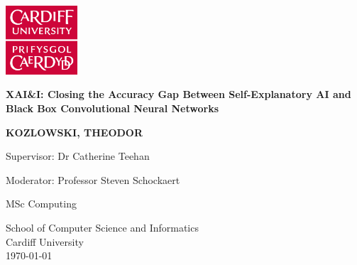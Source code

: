 \begin{titlepage}
    \begin{center}
         \centering
         \includegraphics[width=0.2\textwidth]{images/CUident_RGB.jpg}
         
        \Huge
        \textbf{XAI\&I: Closing the Accuracy Gap Between Self-Explanatory AI and Black Box Convolutional Neural Networks}
        
        
        \vspace{1.5cm}
        
        \textbf{KOZLOWSKI, THEODOR}
   		  \vspace{1.5cm}
        
        \Large{Supervisor: Dr Catherine Teehan}
            \vspace{0.25cm}
            
        \Large{Moderator: Professor Steven Schockaert}
       
        \vspace{0.5cm}
        
        MSc Computing
        
        \vspace{0.5cm}
          \Large
        School of Computer Science and Informatics\\
       Cardiff University \\
       \vspace{0.5cm}
       \today
        
    \end{center}
    

    
\end{titlepage}